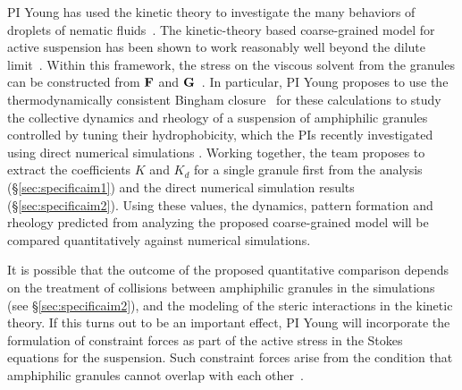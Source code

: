 PI Young has used the kinetic theory to investigate the many behaviors
of droplets of nematic fluids~\cite{YoungShelleyStein2021_MBE}. The
kinetic-theory based coarse-grained model for active suspension has been
shown to work reasonably well beyond the dilute
limit~\cite{Saintillan2018_ARFM}. Within this framework, the stress on
the viscous solvent from the granules can be constructed from ${\bf F}$
and ${\bf G}$~\cite{TraversoMichellin2020_PRF,
TraversoMichellin2022_JFM}. In particular, PI Young proposes to use the
thermodynamically consistent Bingham
closure~\cite{YoungShelleyStein2021_MBE} for these calculations to study
the collective dynamics and rheology of a suspension of amphiphilic granules
controlled by tuning their hydrophobicity, which the PIs recently investigated using direct
numerical simulations \cite{fu-ryh-qua-you2022}. 
Working together, the team proposes to extract the coefficients $K$ and $K_d$ for a
single granule first from the analysis (\S\ref{sec:specificaim1}) and
the direct numerical simulation results (\S\ref{sec:specificaim2}).
Using these values, the dynamics, pattern formation and rheology
predicted from analyzing the proposed coarse-grained model will be
compared quantitatively against numerical simulations. 

It is possible that the outcome of the proposed quantitative comparison
depends on the treatment of collisions between amphiphilic granules in
the simulations (see \S\ref{sec:specificaim2}), and the modeling of the
steric interactions in the kinetic theory. If this turns out to be an
important effect, PI Young will incorporate the formulation of
constraint forces as part of the active stress in the Stokes equations
for the suspension. Such constraint forces arise from the condition
that amphiphilic granules cannot overlap with each
other~\cite{Weady2022_PRF}. 

